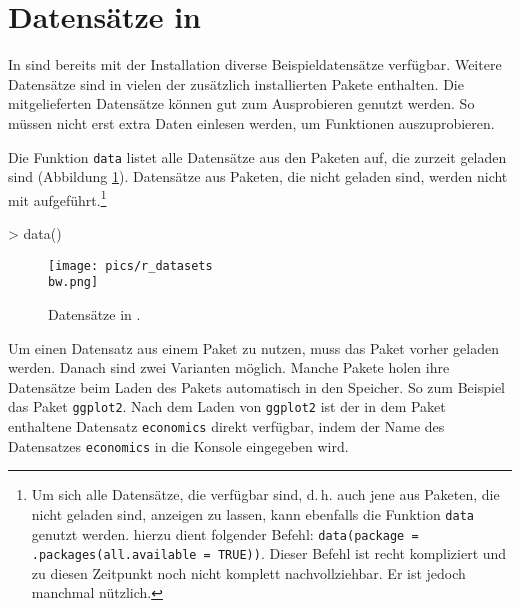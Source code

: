
\section{Datensätze in \R{}}  \label{sec:datensaetze_in_r}

In \R{} sind bereits mit der Installation diverse Beispieldatensätze verfügbar. Weitere Datensätze sind in vielen der zusätzlich installierten Pakete enthalten. Die mitgelieferten Datensätze können gut zum Ausprobieren genutzt werden. So müssen nicht erst extra Daten einlesen werden, um Funktionen auszuprobieren.

Die Funktion \verb!data! listet alle Datensätze aus den Paketen auf, die zurzeit geladen sind (Abbildung \ref{fig:r_datasets}). Datensätze aus Paketen, die nicht geladen sind, werden nicht mit aufgeführt.\footnote{Um sich alle Datensätze, die verfügbar sind, d.\,h. auch jene aus Paketen, die nicht geladen sind, anzeigen zu lassen, kann ebenfalls die Funktion \texttt{data} genutzt werden. hierzu dient folgender Befehl: \texttt{data(package = .packages(all.available = TRUE))}. Dieser Befehl ist recht kompliziert und zu diesen Zeitpunkt noch nicht komplett nachvollziehbar. Er ist jedoch manchmal nützlich. }

\begin{Schunk}
\begin{Sinput}
> data()
\end{Sinput}
\end{Schunk}

\begin{figure}[h]
\begin{center}
  \texttt{[image: pics/r\_datasets\\bw.png]}
  \vspace{-5mm}
  \caption{Datensätze in \R{}.} 
  \label{fig:r_datasets}
\end{center}
\end{figure}      


Um einen Datensatz aus einem Paket zu nutzen, muss das Paket vorher geladen werden. Danach sind zwei Varianten möglich. Manche Pakete holen ihre Datensätze beim Laden des Pakets automatisch in den Speicher. So zum Beispiel das Paket \verb!ggplot2!. Nach dem Laden von \verb!ggplot2! ist der in dem Paket enthaltene Datensatz \verb!economics! direkt verfügbar, indem der Name des Datensatzes \verb!economics! in die Konsole eingegeben wird.

